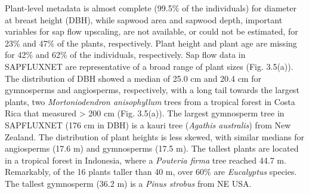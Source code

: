\documentclass[11pt,twoside]{reedthesis}
\begin{document}
Plant-level metadata is almost complete (99.5\% of the individuals) for
diameter at breast height (DBH), while sapwood area and sapwood depth,
important variables for sap flow upscaling, are not available, or could
not be estimated, for 23\% and 47\% of the plants, respectively. Plant
height and plant age are missing for 42\% and 62\% of the individuals,
respectively. Sap flow data in SAPFLUXNET are representative of a broad
range of plant sizes (Fig. 3.5(a)). The distribution of DBH showed a
median of 25.0 cm and 20.4 cm for gymnosperms and angiosperms,
respectively, with a long tail towards the largest plants, two
\emph{Mortoniodendron anisophyllum} trees from a tropical forest in
Costa Rica that measured \textgreater{} 200 cm (Fig. 3.5(a)). The
largest gymnosperm tree in SAPFLUXNET (176 cm in DBH) is a kauri tree
(\emph{Agathis australis}) from New Zealand. The distribution of plant
heights is less skewed, with similar medians for angiosperms (17.6 m)
and gymnosperms (17.5 m). The tallest plants are located in a tropical
forest in Indonesia, where a \emph{Pouteria firma} tree reached 44.7 m.
Remarkably, of the 16 plants taller than 40 m, over 60\% are
\emph{Eucalyptus} species. The tallest gymnosperm (36.2 m) is a
\emph{Pinus strobus} from NE USA.\par
\end{document}
